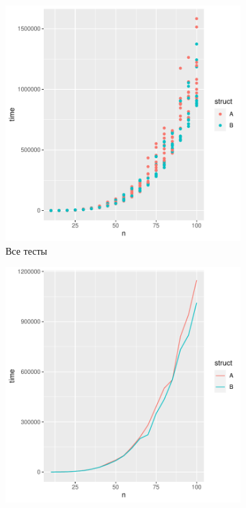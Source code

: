 \documentclass[specialist, substylefile = spbureport.rtx,
               subf,href,colorlinks=true, 12pt]{disser}
\begin{document}
    \begin{figure}[h]
        \begin{minipage}[t]{\columnwidth}%
        \begin{subfigure}[t]{0.475\linewidth}%
            \includegraphics[width=\linewidth]{point.pdf}
            \caption{Все тесты}
        \end{subfigure}%
        \hfill
        \begin{subfigure}[t]{0.475\linewidth}%
            \includegraphics[width=\linewidth]{line.pdf}

\end{subfigure}
\end{minipage}
\end{figure}
\end{document}
